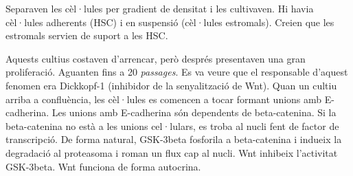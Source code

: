 Separaven les cèl·lules per gradient de densitat i les cultivaven. Hi
havia cèl·lules adherents (HSC) i en suspensió (cèl·lules
estromals). Creien que les estromals servien de suport a les HSC.

Aquests cultius costaven d'arrencar, però després presentaven una gran
proliferació. Aguanten fins a 20 \textit{passages}. Es va veure que el
responsable d'aquest fenomen era Dickkopf-1 (inhibidor de la
senyalització de Wnt). Quan un cultiu arriba a confluència, les
cèl·lules es comencen a tocar formant unions amb E-cadherina. Les
unions amb E-cadherina són dependents de beta-catenina. Si la
beta-catenina no està a les unions cel·lulars, es troba al nucli fent
de factor de transcripció. De forma natural, GSK-3beta fosforila a
beta-catenina i indueix la degradació al proteasoma i roman un flux
cap al nucli. Wnt inhibeix l'activitat GSK-3beta. Wnt funciona de
forma autocrina.